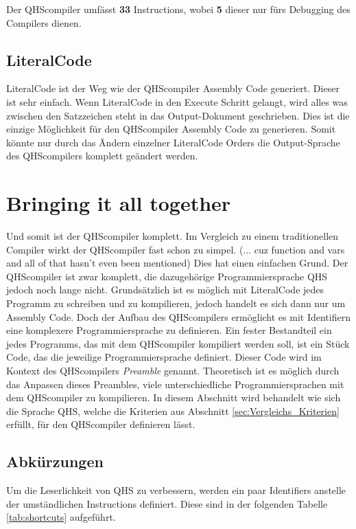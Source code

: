 Der QHScompiler umfässt \textbf{33} Instructions, wobei \textbf{5} dieser nur fürs Debugging des Compilers dienen.

\subsection{LiteralCode}
LiteralCode ist der Weg wie der QHScompiler Assembly Code generiert. Dieser ist sehr einfach. Wenn LiteralCode in den Execute Schritt gelangt, wird alles was zwischen den Satzzeichen steht in das Output-Dokument geschrieben.
Dies ist die einzige Möglichkeit für den QHScompiler Assembly Code zu generieren. Somit könnte nur durch das Ändern einzelner LiteralCode Orders die Output-Sprache des QHScompilers komplett geändert werden.


\section{Bringing it all together} \label{sec:qhs-bringing-it-together}
Und somit ist der QHScompiler komplett. Im Vergleich zu einem traditionellen Compiler wirkt der QHScompiler fast schon zu simpel. (... cuz function and vars and all of that hasn't even been mentioned) 
Dies hat einen einfachen Grund. Der QHScompiler ist zwar komplett, die dazugehörige Programmiersprache QHS jedoch noch lange nicht.
Grundsätzlich ist es möglich mit LiteralCode jedes Programm zu schreiben und zu kompilieren, jedoch handelt es sich dann nur um Assembly Code.
Doch der Aufbau des QHScompilers ermöglicht es mit Identifiern eine komplexere Programmiersprache zu definieren. Ein fester Bestandteil ein jedes Programms, das mit dem QHScompiler kompiliert werden soll, ist ein Stück Code,
das die jeweilige Programmiersprache definiert. Dieser Code wird im Kontext des QHScompilers \textit{Preamble} genannt. Theoretisch ist es möglich durch das Anpassen dieses Preambles, 
viele unterschiedliche Programmiersprachen mit dem QHScompiler zu kompilieren. In diesem Abschnitt wird behandelt wie sich die Sprache QHS, welche die Kriterien aus Abschnitt \ref{sec:Vergleichs_Kriterien} erfüllt,
für den QHScompiler definieren lässt.

\subsection{Abkürzungen}
Um die Leserlichkeit von QHS zu verbessern, werden ein paar Identifiers anstelle der umständlichen Instructions definiert.
Diese sind in der folgenden Tabelle \ref{tab:shortcuts} aufgeführt.

